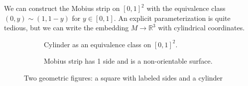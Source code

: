     \begin{example}
      We can construct the Mobius strip on $[0, 1]^2$ with the equivalence class $(0, y) \sim (1, 1 - y)$ for $y \in [0, 1]$. An explicit parameterization is quite tedious, but we can write the embedding $M \rightarrow \mathbb{R}^3$ with cylindrical coordinates. 
      \begin{figure}[H]
        \centering
        \begin{subfigure}[b]{0.48\textwidth}
          \centering
          \caption{Cylinder as an equivalence class on $[0, 1]^2$.}
          \label{fig:mobius_equiv}
        \end{subfigure}
        \hfill 
        \begin{subfigure}[b]{0.48\textwidth}
          \centering 
          \caption{Mobius strip has 1 side and is a non-orientable surface.} 
          \label{fig:mobius_strip_r3}
        \end{subfigure}
        \caption{Two geometric figures: a square with labeled sides and a cylinder}
        \label{fig:mobius_strip}
      \end{figure}
    \end{example}

